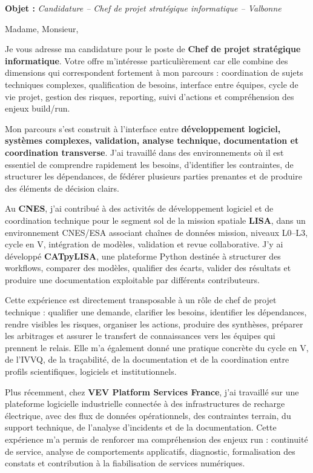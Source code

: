 \documentclass[11pt,a4paper]{altacv}
\begin{document}
\makecvheader
\vspace{-0.6cm}

\vspace{-0.4cm}

{\color{accent}\textbf{Objet :}} \textit{Candidature -- Chef de projet stratégique informatique -- Valbonne}

{\color{body}

Madame, Monsieur,

Je vous adresse ma candidature pour le poste de \textbf{Chef de projet stratégique informatique}. Votre offre m'intéresse particulièrement car elle combine des dimensions qui correspondent fortement à mon parcours : coordination de sujets techniques complexes, qualification de besoins, interface entre équipes, cycle de vie projet, gestion des risques, reporting, suivi d'actions et compréhension des enjeux build/run.

Mon parcours s'est construit à l'interface entre \textbf{développement logiciel, systèmes complexes, validation, analyse technique, documentation et coordination transverse}. J'ai travaillé dans des environnements où il est essentiel de comprendre rapidement les besoins, d'identifier les contraintes, de structurer les dépendances, de fédérer plusieurs parties prenantes et de produire des éléments de décision clairs.

Au \textbf{CNES}, j'ai contribué à des activités de développement logiciel et de coordination technique pour le segment sol de la mission spatiale \textbf{LISA}, dans un environnement CNES/ESA associant chaînes de données mission, niveaux L0--L3, cycle en V, intégration de modèles, validation et revue collaborative. J'y ai développé \textbf{CATpyLISA}, une plateforme Python destinée à structurer des workflows, comparer des modèles, qualifier des écarts, valider des résultats et produire une documentation exploitable par différents contributeurs.

Cette expérience est directement transposable à un rôle de chef de projet technique : qualifier une demande, clarifier les besoins, identifier les dépendances, rendre visibles les risques, organiser les actions, produire des synthèses, préparer les arbitrages et assurer le transfert de connaissances vers les équipes qui prennent le relais. Elle m'a également donné une pratique concrète du cycle en V, de l'IVVQ, de la traçabilité, de la documentation et de la coordination entre profils scientifiques, logiciels et institutionnels.

Plus récemment, chez \textbf{VEV Platform Services France}, j'ai travaillé sur une plateforme logicielle industrielle connectée à des infrastructures de recharge électrique, avec des flux de données opérationnels, des contraintes terrain, du support technique, de l'analyse d'incidents et de la documentation. Cette expérience m'a permis de renforcer ma compréhension des enjeux run : continuité de service, analyse de comportements applicatifs, diagnostic, formalisation des constats et contribution à la fiabilisation de services numériques.

}
\end{document}
